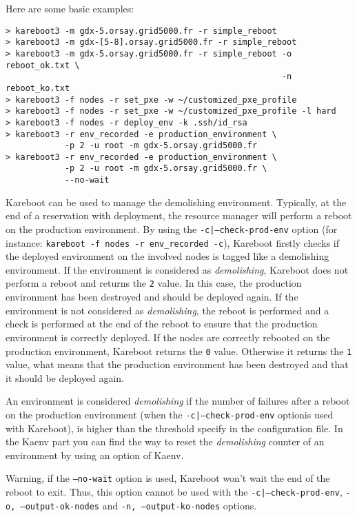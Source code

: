\documentclass[a4wide,10pt,oneside]{book}
\begin{document}
Here are some basic examples:
\begin{verbatim}
> kareboot3 -m gdx-5.orsay.grid5000.fr -r simple_reboot
> kareboot3 -m gdx-[5-8].orsay.grid5000.fr -r simple_reboot
> kareboot3 -m gdx-5.orsay.grid5000.fr -r simple_reboot -o reboot_ok.txt \
                                                        -n reboot_ko.txt
> kareboot3 -f nodes -r set_pxe -w ~/customized_pxe_profile
> kareboot3 -f nodes -r set_pxe -w ~/customized_pxe_profile -l hard
> kareboot3 -f nodes -r deploy_env -k .ssh/id_rsa
> kareboot3 -r env_recorded -e production_environment \
            -p 2 -u root -m gdx-5.orsay.grid5000.fr
> kareboot3 -r env_recorded -e production_environment \
            -p 2 -u root -m gdx-5.orsay.grid5000.fr \
            --no-wait
\end{verbatim}

Kareboot can be used to manage the demolishing environment. Typically, at the end of a reservation with deployment, the resource manager will perform a reboot on the production environment. By using the \texttt{-c|--check-prod-env} option (for instance: \texttt{kareboot -f nodes -r env\_recorded -c}), Kareboot firstly checks if the deployed environment on the involved nodes is tagged like a demolishing environment. If the environment is considered as \textit{demolishing}, Kareboot does not perform a reboot and returns the \texttt{2} value. In this case, the production environment has been destroyed and should be deployed again. If the environment is not considered as \textit{demolishing}, the reboot is performed and a check is performed at the end of the reboot to ensure that the production environment is correctly deployed. If the nodes are correctly rebooted on the production environment, Kareboot returns the \texttt{0} value. Otherwise it returns the \texttt{1} value, what means that the production environment has been destroyed and that it should be deployed again.

An environment is considered \textit{demolishing} if the number of failures after a reboot on the production environment (when the \texttt{-c|--check-prod-env} optionis used with Kareboot), is higher than the threshold specify in the configuration file. In the Kaenv part you can find the way to reset the \textit{demolishing} counter of an environment by using an option of Kaenv.

Warning, if the \texttt{--no-wait} option is used, Kareboot won't wait the end of the reboot to exit. Thus, this option cannot be used with the \texttt{-c|--check-prod-env}, \texttt{-o, --output-ok-nodes} and \texttt{-n, --output-ko-nodes} options.
\end{document}
